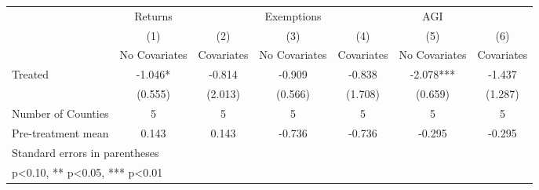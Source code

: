 {
\def\sym#1{\ifmmode^{#1}\else\(^{#1}\)\fi}
\begin{tabular}{l*{6}{c}}
\hline\hline
            &     Returns   &               &  Exemptions   &               &         AGI   &               \\
            &\multicolumn{1}{c}{(1)}&\multicolumn{1}{c}{(2)}&\multicolumn{1}{c}{(3)}&\multicolumn{1}{c}{(4)}&\multicolumn{1}{c}{(5)}&\multicolumn{1}{c}{(6)}\\
            &\multicolumn{1}{c}{No Covariates}&\multicolumn{1}{c}{Covariates}&\multicolumn{1}{c}{No Covariates}&\multicolumn{1}{c}{Covariates}&\multicolumn{1}{c}{No Covariates}&\multicolumn{1}{c}{Covariates}\\
\hline
Treated     &      -1.046*  &      -0.814   &      -0.909   &      -0.838   &      -2.078***&      -1.437   \\
            &     (0.555)   &     (2.013)   &     (0.566)   &     (1.708)   &     (0.659)   &     (1.287)   \\
\hline
Number of Counties&           5   &           5   &           5   &           5   &           5   &           5   \\
Pre-treatment mean&       0.143   &       0.143   &      -0.736   &      -0.736   &      -0.295   &      -0.295   \\
\hline\hline
\multicolumn{7}{l}{\footnotesize Standard errors in parentheses}\\
\multicolumn{7}{l}{\footnotesize * p<0.10, ** p<0.05, *** p<0.01}\\
\end{tabular}
}

